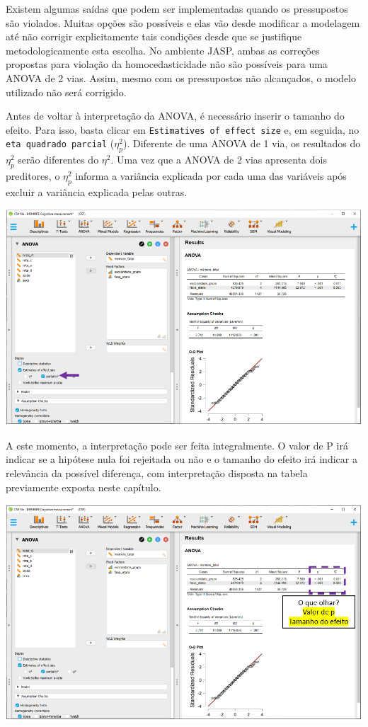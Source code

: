 \documentclass[
]{book}
\begin{document}
Existem algumas saídas que podem ser implementadas quando os pressupostos são violados. Muitas opções são possíveis e elas vão desde modificar a modelagem até não corrigir explicitamente tais condições desde que se justifique metodologicamente esta escolha. No ambiente JASP, ambas as correções propostas para violação da homocedasticidade não são possíveis para uma ANOVA de 2 vias. Assim, mesmo com os pressupostos não alcançados, o modelo utilizado não será corrigido.

Antes de voltar à interpretação da ANOVA, é necessário inserir o tamanho do efeito. Para isso, basta clicar em \texttt{Estimatives\ of\ effect\ size} e, em seguida, no \texttt{eta\ quadrado\ parcial} (\(η_p^2\)). Diferente de uma ANOVA de 1 via, os resultados do \(η_p^2\) serão diferentes do \(η^2\). Uma vez que a ANOVA de 2 vias apresenta dois preditores, o \(η_p^2\) informa a variância explicada por cada uma das variáveis após excluir a variância explicada pelas outras.

\includegraphics{./img/cap_anova_two_way_tamanho_do_efeito.png}

A este momento, a interpretação pode ser feita integralmente. O valor de P irá indicar se a hipótese nula foi rejeitada ou não e o tamanho do efeito irá indicar a relevância da possível diferença, com interpretação disposta na tabela previamente exposta neste capítulo.

\includegraphics{./img/cap_anova_two_way_resultados_finais.png}
\end{document}
